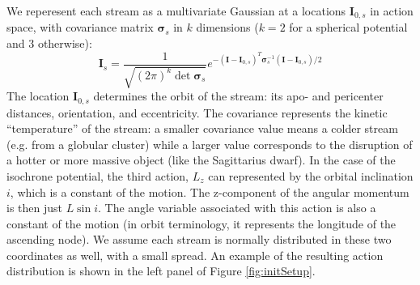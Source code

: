 \documentclass{emulateapj}
\begin{document}
We reperesent each stream as a multivariate Gaussian at a locations $\mathbf{I}_{0,s}$ in action space, with covariance matrix $\mathbf{\sigma}_s$ in $k$ dimensions ($k=2$ for a spherical potential and 3 otherwise): 
\begin{equation}
 \mathbf{I}_s = \frac{1}{\sqrt{(2 \pi)^k \det \mathbf{\sigma}_s}} e^{-(\mathbf{I}-\mathbf{I}_{0,s})^T \mathbf{\sigma}_s^{-1} (\mathbf{I}-\mathbf{I}_{0,s})/2}
\end{equation} 
The location $\mathbf{I}_{0,s}$ determines the orbit of the stream: its apo- and pericenter distances, orientation, and eccentricity. The covariance represents the kinetic ``temperature'' of the stream: a smaller covariance value means a colder stream (e.g. from a globular cluster) while a larger value corresponds to the disruption of a hotter or more massive object (like the Sagittarius dwarf). In the case of the isochrone potential, the third action, $L_z$ can represented by the orbital inclination $i$, which is a constant of the motion. The z-component of the angular momentum is then just $L \sin i$. The angle variable associated with this action is also a constant of the motion (in orbit terminology, it represents the longitude of the ascending node). We assume each stream is normally distributed in these two coordinates as well, with a small spread. An example of the resulting action distribution is shown in the left panel of Figure \ref{fig:initSetup}.
\end{document}
